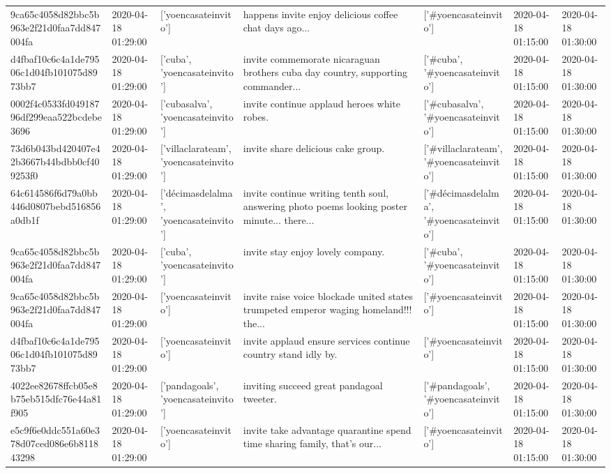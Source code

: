\begin{tabular}{lllllll}
9ca65c4058d82bbc5b963e2f21d0faa7dd847004fa & 2020-04-18 01:29:00 & ['yoencasateinvito'] & happens invite enjoy delicious coffee chat days ago... & ['#yoencasateinvito'] & 2020-04-18 01:15:00 & 2020-04-18 01:30:00 \\
d4fbaf10c6c4a1de79506c1d04fb101075d8973bb7 & 2020-04-18 01:29:00 & ['cuba', 'yoencasateinvito'] & invite commemorate nicaraguan brothers cuba day country, supporting commander... & ['#cuba', '#yoencasateinvito'] & 2020-04-18 01:15:00 & 2020-04-18 01:30:00 \\
0002f4c0533fd04918796df299eaa522bcdebe3696 & 2020-04-18 01:29:00 & ['cubasalva', 'yoencasateinvito'] & invite continue applaud heroes white robes. & ['#cubasalva', '#yoencasateinvito'] & 2020-04-18 01:15:00 & 2020-04-18 01:30:00 \\
73d6b043bd420407e42b3667b44bdbb0cf409253f0 & 2020-04-18 01:29:00 & ['villaclarateam', 'yoencasateinvito'] & invite share delicious cake group. & ['#villaclarateam', '#yoencasateinvito'] & 2020-04-18 01:15:00 & 2020-04-18 01:30:00 \\
64c614586f6d79a0bb446d0807bebd516856a0db1f & 2020-04-18 01:29:00 & ['décimasdelalma', 'yoencasateinvito'] & invite continue writing tenth soul, answering photo poems looking poster minute... there... & ['#décimasdelalma', '#yoencasateinvito'] & 2020-04-18 01:15:00 & 2020-04-18 01:30:00 \\
9ca65c4058d82bbc5b963e2f21d0faa7dd847004fa & 2020-04-18 01:29:00 & ['cuba', 'yoencasateinvito'] & invite stay enjoy lovely company. & ['#cuba', '#yoencasateinvito'] & 2020-04-18 01:15:00 & 2020-04-18 01:30:00 \\
9ca65c4058d82bbc5b963e2f21d0faa7dd847004fa & 2020-04-18 01:29:00 & ['yoencasateinvito'] & invite raise voice blockade united states trumpeted emperor waging homeland!!! the... & ['#yoencasateinvito'] & 2020-04-18 01:15:00 & 2020-04-18 01:30:00 \\
d4fbaf10c6c4a1de79506c1d04fb101075d8973bb7 & 2020-04-18 01:29:00 & ['yoencasateinvito'] & invite applaud ensure services continue country stand idly by. & ['#yoencasateinvito'] & 2020-04-18 01:15:00 & 2020-04-18 01:30:00 \\
4022ee82678ffcb05e8b75eb515dfc76e44a81f905 & 2020-04-18 01:29:00 & ['pandagoals', 'yoencasateinvito'] & inviting succeed great pandagoal tweeter. & ['#pandagoals', '#yoencasateinvito'] & 2020-04-18 01:15:00 & 2020-04-18 01:30:00 \\
e5c9f6e0ddc551a60e378d07ced086e6b811843298 & 2020-04-18 01:29:00 & ['yoencasateinvito'] & invite take advantage quarantine spend time sharing family, that's our... & ['#yoencasateinvito'] & 2020-04-18 01:15:00 & 2020-04-18 01:30:00 \\

\end{tabular}
